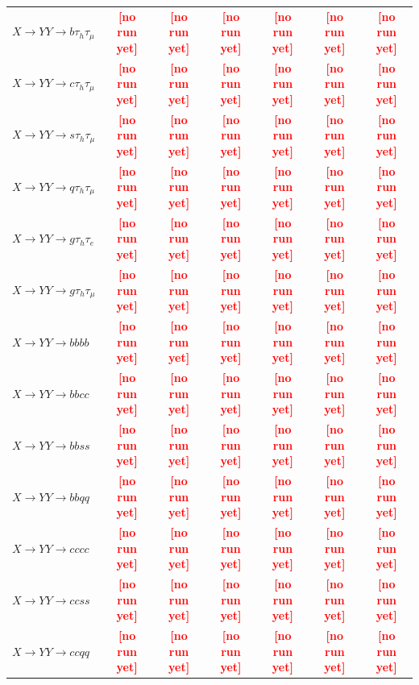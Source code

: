 \documentclass[12pt]{article}   %
\newcommand{\pending}[1]{\textcolor{red}{\textbf{[#1]}}}
\begin{document}
\begin{landscape}
{\begin{longtable}{@{\extracolsep{\fill}}lcccccc@{}}
$X\to YY\to b\tau_h\tau_\mu$ & \pending{no run yet} & \pending{no run yet} & \pending{no run yet} & \pending{no run yet} & \pending{no run yet} & \pending{no run yet} \\
$X\to YY\to c\tau_h\tau_\mu$ & \pending{no run yet} & \pending{no run yet} & \pending{no run yet} & \pending{no run yet} & \pending{no run yet} & \pending{no run yet} \\
$X\to YY\to s\tau_h\tau_\mu$ & \pending{no run yet} & \pending{no run yet} & \pending{no run yet} & \pending{no run yet} & \pending{no run yet} & \pending{no run yet} \\
$X\to YY\to q\tau_h\tau_\mu$ & \pending{no run yet} & \pending{no run yet} & \pending{no run yet} & \pending{no run yet} & \pending{no run yet} & \pending{no run yet} \\
$X\to YY\to g\tau_h\tau_e$ & \pending{no run yet} & \pending{no run yet} & \pending{no run yet} & \pending{no run yet} & \pending{no run yet} & \pending{no run yet} \\
$X\to YY\to g\tau_h\tau_\mu$ & \pending{no run yet} & \pending{no run yet} & \pending{no run yet} & \pending{no run yet} & \pending{no run yet} & \pending{no run yet} \\
\midrule
$X\to YY\to bbbb$ & \pending{no run yet} & \pending{no run yet} & \pending{no run yet} & \pending{no run yet} & \pending{no run yet} & \pending{no run yet} \\
$X\to YY\to bbcc$ & \pending{no run yet} & \pending{no run yet} & \pending{no run yet} & \pending{no run yet} & \pending{no run yet} & \pending{no run yet} \\
$X\to YY\to bbss$ & \pending{no run yet} & \pending{no run yet} & \pending{no run yet} & \pending{no run yet} & \pending{no run yet} & \pending{no run yet} \\
$X\to YY\to bbqq$ & \pending{no run yet} & \pending{no run yet} & \pending{no run yet} & \pending{no run yet} & \pending{no run yet} & \pending{no run yet} \\
$X\to YY\to cccc$ & \pending{no run yet} & \pending{no run yet} & \pending{no run yet} & \pending{no run yet} & \pending{no run yet} & \pending{no run yet} \\
$X\to YY\to ccss$ & \pending{no run yet} & \pending{no run yet} & \pending{no run yet} & \pending{no run yet} & \pending{no run yet} & \pending{no run yet} \\
$X\to YY\to ccqq$ & \pending{no run yet} & \pending{no run yet} & \pending{no run yet} & \pending{no run yet} & \pending{no run yet} & \pending{no run yet} \\

\end{longtable}}
\end{landscape}
\end{document}
